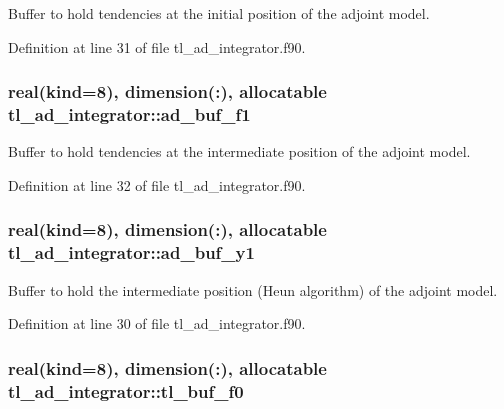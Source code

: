 Buffer to hold tendencies at the initial position of the adjoint model. 



Definition at line 31 of file tl\-\_\-ad\-\_\-integrator.\-f90.

\hypertarget{classtl__ad__integrator_a2508746d3cc1d3200a14181761e7a19f}{
\subsubsection[{ad\-\_\-buf\-\_\-f1}]{\setlength{\rightskip}{0pt plus 5cm}real(kind=8), dimension(\-:), allocatable tl\-\_\-ad\-\_\-integrator\-::ad\-\_\-buf\-\_\-f1\hspace{0.3cm}{\ttfamily [private]}}}\label{classtl__ad__integrator_a2508746d3cc1d3200a14181761e7a19f}


Buffer to hold tendencies at the intermediate position of the adjoint model. 



Definition at line 32 of file tl\-\_\-ad\-\_\-integrator.\-f90.

\hypertarget{classtl__ad__integrator_a7b9ea21348323bdf5900c7adc2bced11}{
\subsubsection[{ad\-\_\-buf\-\_\-y1}]{\setlength{\rightskip}{0pt plus 5cm}real(kind=8), dimension(\-:), allocatable tl\-\_\-ad\-\_\-integrator\-::ad\-\_\-buf\-\_\-y1\hspace{0.3cm}{\ttfamily [private]}}}\label{classtl__ad__integrator_a7b9ea21348323bdf5900c7adc2bced11}


Buffer to hold the intermediate position (Heun algorithm) of the adjoint model. 



Definition at line 30 of file tl\-\_\-ad\-\_\-integrator.\-f90.

\hypertarget{classtl__ad__integrator_a52a1c9e0109041c0b07626e46af52038}{
\subsubsection[{tl\-\_\-buf\-\_\-f0}]{\setlength{\rightskip}{0pt plus 5cm}real(kind=8), dimension(\-:), allocatable tl\-\_\-ad\-\_\-integrator\-::tl\-\_\-buf\-\_\-f0\hspace{0.3cm}{\ttfamily [private]}}}\label{classtl__ad__integrator_a52a1c9e0109041c0b07626e46af52038}


